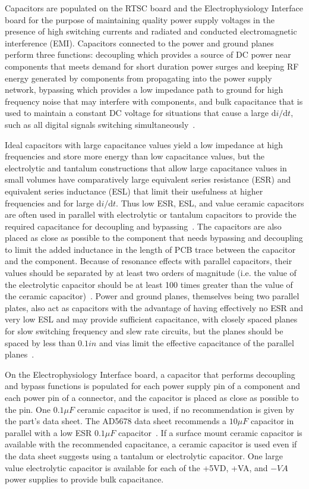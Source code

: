Capacitors are populated on the RTSC board and the Electrophysiology Interface board for the purpose of maintaining quality power supply voltages in the presence of high switching currents and radiated and conducted electromagnetic interference (EMI).  Capacitors connected to the power and ground planes perform three functions: decoupling which provides a source of DC power near components that meets demand for short duration power surges and keeping RF energy generated by components from propagating into the power supply network, bypassing which provides a low impedance path to ground for high frequency noise that may interfere with components, and bulk capacitance that is used to maintain a constant DC voltage for situations that cause a large $\mathrm{d}i/\mathrm{d}t$, such as all digital signals switching simultaneously~\cite{Montrose1999}.

Ideal capacitors with large capacitance values yield a low impedance at high frequencies and store more energy than low capacitance values, but the electrolytic and tantalum constructions that allow large capacitance values in small volumes have comparatively large equivalent series resistance (ESR) and equivalent series inductance (ESL) that limit their usefulness at higher frequencies and for large $\mathrm{d}i/\mathrm{d}t$.  Thus low ESR, ESL, and value ceramic capacitors are often used in parallel with electrolytic or tantalum capacitors to provide the required capacitance for decoupling and bypassing~\cite{Montrose1999}.  The capacitors are also placed as close as possible to the component that needs bypassing and decoupling to limit the added inductance in the length of PCB trace between the capacitor and the component.  Because of resonance effects with parallel capacitors, their values should be separated by at least two orders of magnitude (i.e. the value of the electrolytic capacitor should be at least 100 times greater than the value of the ceramic capacitor)~\cite{Montrose1999}.  Power and ground planes, themselves being two parallel plates, also act as capacitors with the advantage of having effectively no ESR and very low ESL and may provide sufficient capacitance, with closely spaced planes for slow switching frequency and slew rate circuits, but the planes should be spaced by less than $0.1\unit{in}$ and vias limit the effective capacitance of the parallel planes~\cite{Montrose1999}.

On the Electrophysiology Interface board, a capacitor that performs decoupling and bypass functions is populated for each power supply pin of a component and each power pin of a connector, and the capacitor is placed as close as possible to the pin.  One $0.1\unit{\mu F}$ ceramic capacitor is used, if no recommendation is given by the part's data sheet.  The AD5678 data sheet recommends a $10\unit{\mu F}$ capacitor in parallel with a low ESR $0.1\unit{\mu F}$ capacitor~\cite{AD5678ds}.  If a surface mount ceramic capacitor is available with the recommended capacitance, a ceramic capacitor is used even if the data sheet suggests using a tantalum or electrolytic capacitor.  One large value electrolytic capacitor is available for each of the +5VD, +VA, and $\unit{-VA}$ power supplies to provide bulk capacitance.
